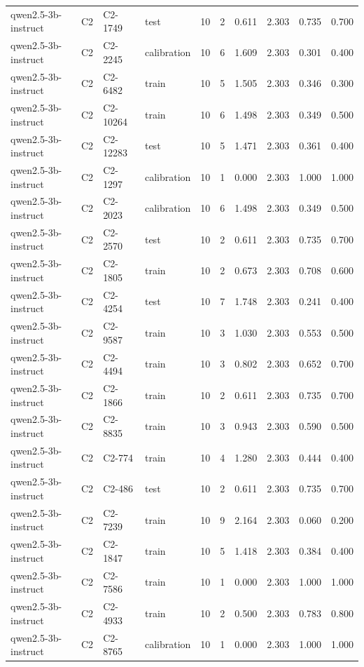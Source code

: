 \begin{table}
\begin{tabular}{llllrrrrrr}
qwen2.5-3b-instruct & C2 & C2-1749 & test & 10 & 2 & 0.611 & 2.303 & 0.735 & 0.700 \\
qwen2.5-3b-instruct & C2 & C2-2245 & calibration & 10 & 6 & 1.609 & 2.303 & 0.301 & 0.400 \\
qwen2.5-3b-instruct & C2 & C2-6482 & train & 10 & 5 & 1.505 & 2.303 & 0.346 & 0.300 \\
qwen2.5-3b-instruct & C2 & C2-10264 & train & 10 & 6 & 1.498 & 2.303 & 0.349 & 0.500 \\
qwen2.5-3b-instruct & C2 & C2-12283 & test & 10 & 5 & 1.471 & 2.303 & 0.361 & 0.400 \\
qwen2.5-3b-instruct & C2 & C2-1297 & calibration & 10 & 1 & 0.000 & 2.303 & 1.000 & 1.000 \\
qwen2.5-3b-instruct & C2 & C2-2023 & calibration & 10 & 6 & 1.498 & 2.303 & 0.349 & 0.500 \\
qwen2.5-3b-instruct & C2 & C2-2570 & test & 10 & 2 & 0.611 & 2.303 & 0.735 & 0.700 \\
qwen2.5-3b-instruct & C2 & C2-1805 & train & 10 & 2 & 0.673 & 2.303 & 0.708 & 0.600 \\
qwen2.5-3b-instruct & C2 & C2-4254 & test & 10 & 7 & 1.748 & 2.303 & 0.241 & 0.400 \\
qwen2.5-3b-instruct & C2 & C2-9587 & train & 10 & 3 & 1.030 & 2.303 & 0.553 & 0.500 \\
qwen2.5-3b-instruct & C2 & C2-4494 & train & 10 & 3 & 0.802 & 2.303 & 0.652 & 0.700 \\
qwen2.5-3b-instruct & C2 & C2-1866 & train & 10 & 2 & 0.611 & 2.303 & 0.735 & 0.700 \\
qwen2.5-3b-instruct & C2 & C2-8835 & train & 10 & 3 & 0.943 & 2.303 & 0.590 & 0.500 \\
qwen2.5-3b-instruct & C2 & C2-774 & train & 10 & 4 & 1.280 & 2.303 & 0.444 & 0.400 \\
qwen2.5-3b-instruct & C2 & C2-486 & test & 10 & 2 & 0.611 & 2.303 & 0.735 & 0.700 \\
qwen2.5-3b-instruct & C2 & C2-7239 & train & 10 & 9 & 2.164 & 2.303 & 0.060 & 0.200 \\
qwen2.5-3b-instruct & C2 & C2-1847 & train & 10 & 5 & 1.418 & 2.303 & 0.384 & 0.400 \\
qwen2.5-3b-instruct & C2 & C2-7586 & train & 10 & 1 & 0.000 & 2.303 & 1.000 & 1.000 \\
qwen2.5-3b-instruct & C2 & C2-4933 & train & 10 & 2 & 0.500 & 2.303 & 0.783 & 0.800 \\
qwen2.5-3b-instruct & C2 & C2-8765 & calibration & 10 & 1 & 0.000 & 2.303 & 1.000 & 1.000 \\

\end{tabular}
\end{table}
